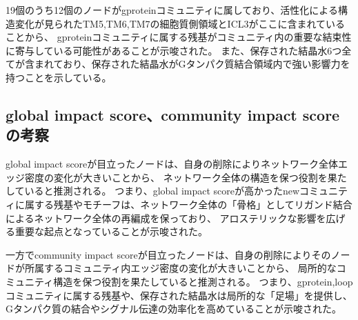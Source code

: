 \newpage

19個のうち12個のノードがgproteinコミュニティに属しており、活性化による構造変化が見られたTM5,TM6,TM7の細胞質側領域とICL3がここに含まれていることから、
gproteinコミュニティに属する残基がコミュニティ内の重要な結束性に寄与している可能性があることが示唆された。
また、保存された結晶水6つ全てが含まれており、保存された結晶水がGタンパク質結合領域内で強い影響力を持つことを示している。


\subsection{global impact score、community impact scoreの考察}

global impact scoreが目立ったノードは、自身の削除によりネットワーク全体エッジ密度の変化が大きいことから、
ネットワーク全体の構造を保つ役割を果たしていると推測される。
つまり、global impact scoreが高かったnewコミュニティに属する残基やモチーフは、ネットワーク全体の「骨格」としてリガンド結合によるネットワーク全体の再編成を保っており、
アロステリックな影響を広げる重要な起点となっていることが示唆された。


一方でcommunity impact scoreが目立ったノードは、自身の削除によりそのノードが所属するコミュニティ内エッジ密度の変化が大きいことから、
局所的なコミュニティ構造を保つ役割を果たしていると推測される。
つまり、gprotein,loopコミュニティに属する残基や、保存された結晶水は局所的な「足場」を提供し、Gタンパク質の結合やシグナル伝達の効率化を高めていることが示唆された。





